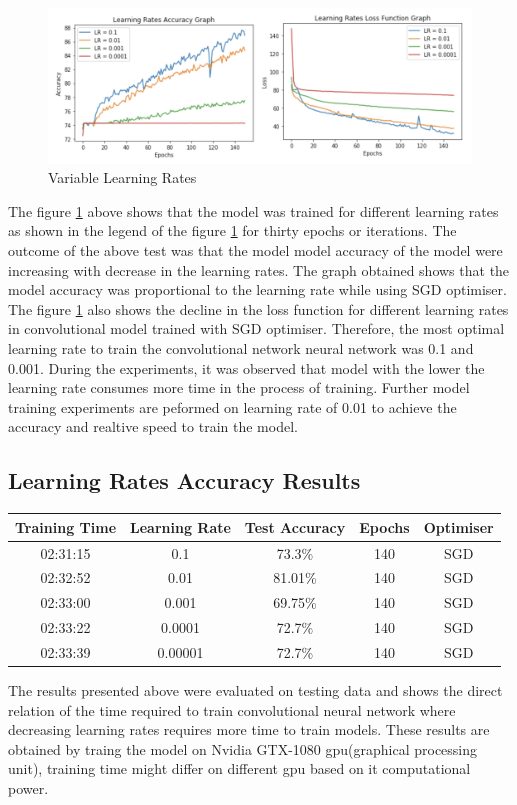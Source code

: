 \begin{figure}[!htp]
    \centering
    \includegraphics[width=15cm]{Images/lr.png}
    \caption{Variable Learning Rates}
    \label{fig:lrates}
\end{figure}

The figure \ref{fig:lrates} above shows that the model was trained for different learning rates as shown
in the legend of the figure \ref{fig:lrates} for thirty epochs or iterations. The outcome of the above test 
was that the model model accuracy of the model were increasing with decrease in the learning rates. 
The graph obtained shows that the model accuracy was proportional to the learning rate while using SGD optimiser. 
The figure \ref{fig:lrates} also shows the decline in the loss function for different learning rates in 
convolutional model trained with SGD optimiser. Therefore, the most optimal learning rate to train the convolutional network 
neural network was 0.1 and 0.001. During the experiments, it was observed that model with the lower the learning rate consumes more time in the 
process of training. Further model training experiments are peformed on 
learning rate of 0.01 to achieve the accuracy and realtive speed to train the model.

\subsection*{Learning Rates Accuracy Results}

\begin{center}
    \begin{tabular} { | c | c | c | c | c |}
        \hline
        Training Time & Learning Rate & Test Accuracy & Epochs  & Optimiser\\ 
        \hline
        02:31:15 & 0.1 & 73.3\% & 140 & SGD \\ 
        \hline 
        02:32:52 & 0.01 & 81.01\% & 140 & SGD  \\
        \hline 
        02:33:00 & 0.001 & 69.75\% & 140 & SGD \\
        \hline
        02:33:22 & 0.0001 & 72.7\% & 140 & SGD \\
        \hline
        02:33:39 & 0.00001 & 72.7\% & 140 & SGD \\
        \hline
    \end{tabular}
\end{center}

The results presented above were evaluated on testing data and shows the 
direct relation of the time required to train convolutional neural network 
where decreasing learning rates requires more time to train models. These results 
are obtained by traing the model on Nvidia GTX-1080 gpu(graphical processing unit), training 
time might differ on different gpu based on it computational power.